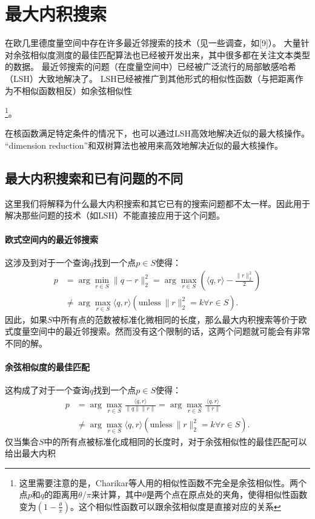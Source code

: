 \documentclass[twocolumn,a4paper]{article}
\begin{document}
\section{最大内积搜索}
在欧几里德度量空间中存在许多最近邻搜索的技术（见一些调查，如[9]）。 大量针对余弦相似度测度的最佳匹配算法也已经被开发出来，其中很多都在关注文本类型的数据。 最近邻搜索的问题（在度量空间中）已经被广泛流行的局部敏感哈希（LSH）大致地解决了。 LSH已经被推广到其他形式的相似性函数（与把距离作为不相似函数相反）如余弦相似性

\footnote{这里需要注意的是，Charikar等人用的相似性函数不完全是余弦相似性。两个点$p$和$q$的距离用$\theta$/$\pi$来计算，其中$\theta$是两个点在原点处的夹角，使得相似性函数变为$\left(1-\frac{\theta}{\pi}\right)$。这个相似性函数可以跟余弦相似度是直接对应的关系}。

在核函数满足特定条件的情况下，也可以通过LSH高效地解决近似的最大核操作。 “dimension reduction”和双树算法也被用来高效地解决近似的最大核操作。

\subsection{最大内积搜索和已有问题的不同}
这里我们将解释为什么最大内积搜索和其它已有的搜索问题都不太一样。因此用于解决那些问题的技术（如LSH）不能直接应用于这个问题。

\paragraph{欧式空间内的最近邻搜索}这涉及到对于一个查询$q$找到一个点$p \in S$使得：
\begin{align*}
p &= \arg \min_{r \in S}\|q - r\|^2_2 = \arg \max_{r \in S}\left(\langle q,r \rangle - \frac{\|r\|_2^2}{2}\right) \\
  &  \neq \arg \max_{r \in S} \langle q,r \rangle (\mathrm{unless}\ \|r\|_2^2 = k \forall r \in S).
\end{align*}
因此，如果$S$中所有点的范数被标准化微相同的长度，那么最大内积搜索等价于欧式度量空间中的最近邻搜索。然而没有这个限制的话，这两个问题就可能会有非常不同的解。

\paragraph{余弦相似度的最佳匹配}这构成了对于一个查询$q$找到一个点$p \in S$使得：
\begin{align*}
p &= \arg \max_{r \in S} \frac{\langle q,r \rangle}{\|q\|\|r\|} = \arg \max_{r \in S} \frac{\langle q,r \rangle}{\|r\|} \\
    &\neq \arg \max_{r \in S} \langle q,r \rangle (\mathrm{unless}\ \|r\|_2^2 = k \forall r \in S).
\end{align*}
仅当集合$S$中的所有点被标准化成相同的长度时，对于余弦相似性的最佳匹配可以给出最大内积
\end{document}
